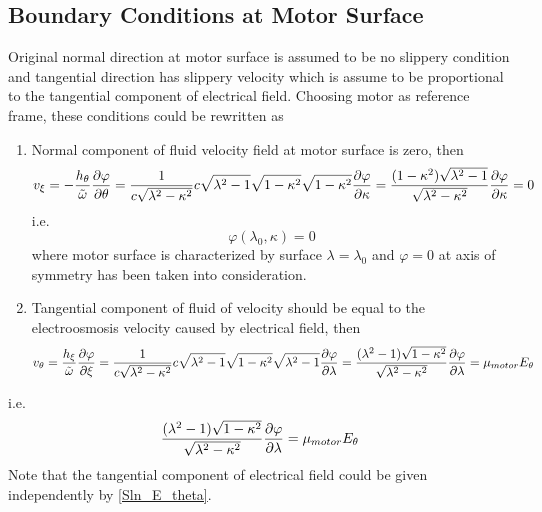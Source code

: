 \documentclass[fontsize=11pt, %
                             paper=a4, %
                             twoside, %
                             captions=tableheading,
                             index=totoc,
                             hyperref]{labbook}
\begin{document}
\begin{addmargin}[4cm]{0cm}
\subsection{Boundary Conditions at Motor Surface}
Original normal direction at motor surface is assumed to be no slippery condition and tangential direction has slippery velocity which is assume to be proportional to the tangential component of electrical field. Choosing motor as reference frame, these conditions could be rewritten as
\begin{enumerate}
\item
Normal component of fluid velocity field at motor surface is zero, then
\begin{equation}
v_{\xi}=-\frac{h_\theta}{\tilde{\omega}}\frac{\partial \varphi}{\partial \theta}=\frac{1}{c\sqrt{\lambda^2-\kappa^2}}c\sqrt{\lambda^2-1}\sqrt{1-\kappa^2}\sqrt{1-\kappa^2}\frac{\partial \varphi}{\partial \kappa}=\frac{(1-\kappa^2)\sqrt{\lambda^2-1}}{\sqrt{\lambda^2-\kappa^2}}\frac{\partial \varphi}{\partial \kappa}=0
\end{equation}
i.e.
\begin{equation}
\varphi(\lambda_0,\kappa)=0
\end{equation}
where motor surface is characterized by surface $\lambda=\lambda_0$ and $\varphi=0$ at axis of symmetry has been taken into consideration.
\item Tangential component of fluid of velocity should be equal to the electroosmosis velocity caused by electrical field, then
\begin{equation}
v_\theta=\frac{h_\xi}{\tilde{\omega}}\frac{\partial \varphi}{\partial \xi}=\frac{1}{c\sqrt{\lambda^2-\kappa^2}}c\sqrt{\lambda^2-1}\sqrt{1-\kappa^2}\sqrt{\lambda^2-1}\frac{\partial \varphi}{\partial \lambda}=\frac{(\lambda^2-1)\sqrt{1-\kappa^2}}{\sqrt{\lambda^2-\kappa^2}}\frac{\partial \varphi}{\partial \lambda}=\mu_{motor}E_\theta
\end{equation}
\end{enumerate}
i.e.
\begin{equation}
\frac{(\lambda^2-1)\sqrt{1-\kappa^2}}{\sqrt{\lambda^2-\kappa^2}}\frac{\partial \varphi}{\partial \lambda}=\mu_{motor}E_\theta
\end{equation}
Note that the tangential component of electrical field could be given independently by \ref{Sln_E_theta}.

\end{addmargin}
\end{document}
